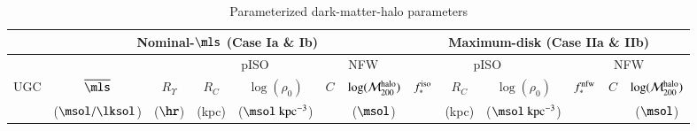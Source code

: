 %
\begin{table}
\caption{\label{tab:DMfit}
Parameterized dark-matter-halo parameters}
\centering
%
{\footnotesize 
\renewcommand{\tabcolsep}{1.0mm}
\begin{tabular}{|r |r |r |r r |r r |c c c |c c c|}
\hline
%
\multicolumn{1}{|c}{}                                  &
\multicolumn{6}{|c}{Nominal-$\mls$ (Case Ia \& Ib)}    &
\multicolumn{6}{|c|}{Maximum-disk (Case IIa \& IIb)}    \\
\hline
%
\multicolumn{1}{|c}{}                                  &
\multicolumn{1}{|c}{}                                  &
\multicolumn{1}{|c}{}                                  &
\multicolumn{2}{|c}{pISO}                              &
\multicolumn{2}{|c}{NFW}                               &
\multicolumn{3}{|c}{pISO}                              &
\multicolumn{3}{|c|}{NFW}                              \\
%
\multicolumn{1}{|c}{UGC}                               & 
\multicolumn{1}{|c}{$\overline{\mls}$}                 &
\multicolumn{1}{|c}{$R_{\Upsilon}$}                    &
\multicolumn{1}{|c}{$R_C$}                              & 
\multicolumn{1}{c}{$\log(\rho_0)$}                     & 
\multicolumn{1}{|c}{$C$}                               & 
\multicolumn{1}{c}{$\log(\mathcal{M}_{200}^{\rm halo})$} &
\multicolumn{1}{|c}{$f_{\ast}^{\rm iso}$}              &
\multicolumn{1}{c}{$R_C$}                               & 
\multicolumn{1}{c}{$\log(\rho_0)$}                     &  
\multicolumn{1}{|c}{$f_{\ast}^{\rm nfw}$}              &
\multicolumn{1}{c}{$C$}                                & 
\multicolumn{1}{c|}{$\log(\mathcal{M}_{200}^{\rm halo})$}                   \\
%
\multicolumn{1}{|c}{}                                  & 
\multicolumn{1}{|c}{($\msol/\lksol$)}         &
\multicolumn{1}{|c}{($\hr$)}                           &
\multicolumn{1}{|c}{(kpc)}                             & 
\multicolumn{1}{c}{($\msol~{\rm kpc^{-3}}$)}       & 
\multicolumn{1}{|c}{}                                  & 
\multicolumn{1}{c}{($\msol$)}                      &
\multicolumn{1}{|c}{}                                  &
\multicolumn{1}{c}{(kpc)}                              & 
\multicolumn{1}{c}{($\msol~{\rm kpc^{-3}}$)}       &  
\multicolumn{1}{|c}{}                                  &
\multicolumn{1}{c}{}                                   & 
\multicolumn{1}{c|}{($\msol$)}                     \\

\end{tabular}}
\end{table}
